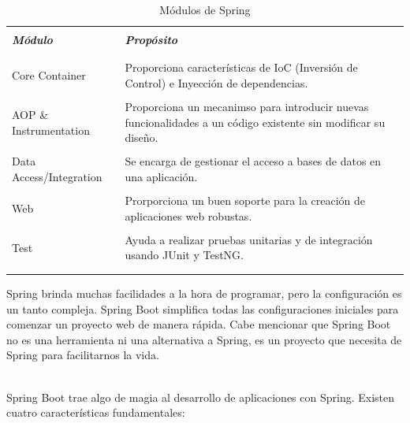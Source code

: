 			\begin{table}[H]
				\begin{tabular}{|p{4.75cm}|p{12cm}|} \hline
					 & \\
					\textit{\bfseries Módulo} & \textit{\bfseries Propósito} \\
					 & \\ \hline
					 
					 & \\
					Core Container & Proporciona características de IoC (Inversión de Control)
					e Inyección de dependencias.\\
					 & \\
					 
					AOP \& Instrumentation & Proporciona un mecanimso para introducir nuevas
					funcionalidades a un código existente sin modificar su diseño.\\
					& \\
					
					Data Access/Integration & Se encarga de gestionar el acceso a bases de
					datos en una aplicación.\\
					& \\
					
					Web & Prorporciona un buen soporte para la creación de aplicaciones web
					robustas.\\
					& \\
					
					Test & Ayuda a realizar pruebas unitarias y de integración usando JUnit y
					TestNG.\\
					& \\
					
					& \\ \hline
				\end{tabular}
				\caption{Módulos de Spring}
			\end{table}
			
			
			
		
		Spring brinda muchas facilidades a la hora de programar, pero la
		configuración es un tanto compleja. Spring Boot simplifica todas las
		configuraciones iniciales para comenzar un proyecto web de manera rápida.
		Cabe mencionar que Spring Boot no es una herramienta ni una alternativa a Spring,
		es un proyecto que necesita de Spring para facilitarnos la vida.\\\
		
		Spring Boot trae algo de magia al desarrollo de aplicaciones con Spring.
		Existen cuatro características fundamentales:
		

